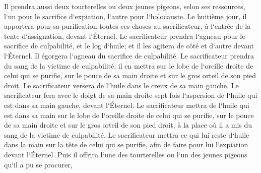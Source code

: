 \verse Il prendra aussi deux tourterelles ou deux jeunes pigeons, selon ses ressources, l`un pour le sacrifice d`expiation, l`autre pour l`holocauste. 
\verse Le huitième jour, il apportera pour sa purification toutes ces choses au sacrificateur, à l`entrée de la tente d`assignation, devant l`Éternel. 
\verse Le sacrificateur prendra l`agneau pour le sacrifice de culpabilité, et le log d`huile; et il les agitera de côté et d`autre devant l`Éternel. 
\verse Il égorgera l`agneau du sacrifice de culpabilité. Le sacrificateur prendra du sang de la victime de culpabilité; il en mettra sur le lobe de l`oreille droite de celui qui se purifie, sur le pouce de sa main droite et sur le gros orteil de son pied droit. 
\verse Le sacrificateur versera de l`huile dans le creux de sa main gauche. 
\verse Le sacrificateur fera avec le doigt de sa main droite sept fois l`aspersion de l`huile qui est dans sa main gauche, devant l`Éternel. 
\verse Le sacrificateur mettra de l`huile qui est dans sa main sur le lobe de l`oreille droite de celui qui se purifie, sur le pouce de sa main droite et sur le gros orteil de son pied droit, à la place où il a mis du sang de la victime de culpabilité. 
\verse Le sacrificateur mettra ce qui lui reste d`huile dans la main sur la tête de celui qui se purifie, afin de faire pour lui l`expiation devant l`Éternel. 
\verse Puis il offrira l`une des tourterelles ou l`un des jeunes pigeons qu`il a pu se procurer, 
